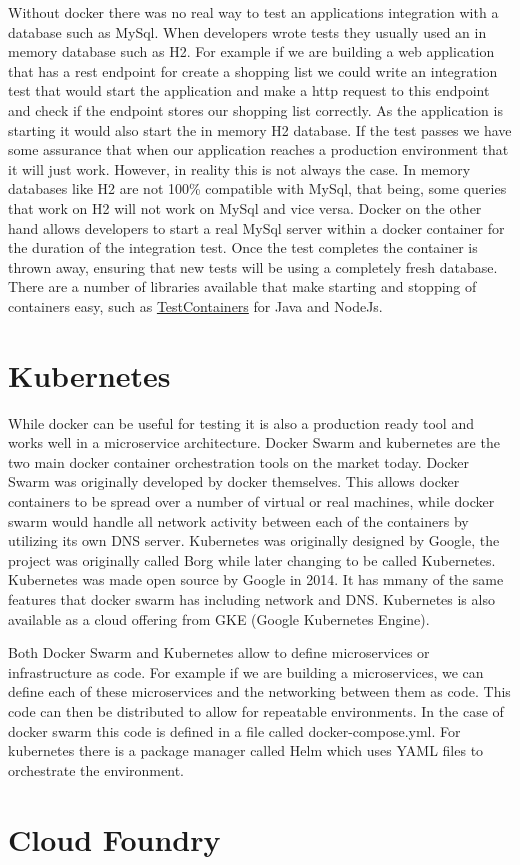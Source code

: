 Without docker there was no real way to test an applications integration with a database such as MySql. When developers wrote tests they usually used an in memory database such as H2. For example if we are building a web application that has a rest endpoint for create a shopping list we could write an integration test that would start the application and make a http request to this endpoint and check if the endpoint stores our shopping list correctly. As the application is starting it would also start the in memory H2 database. If the test passes we have some assurance that when our application reaches a production environment that it will just work. However, in reality this is not always the case. In memory databases like H2 are not 100\% compatible with MySql, that being, some queries that work on H2 will not work on MySql and vice versa. Docker on the other hand allows developers to start a real MySql server within a docker container for the duration of the integration test. Once the test completes the container is thrown away, ensuring that new tests will be using a completely fresh database. There are a number of libraries available that make starting and stopping of containers easy, such as \href{https://www.testcontainers.org/}{TestContainers} for Java and NodeJs.

\section{Kubernetes}

While docker can be useful for testing it is also a production ready tool and works well in a microservice architecture. Docker Swarm and kubernetes are the two main docker container orchestration tools on the market today. Docker Swarm was originally developed by docker themselves. This allows docker containers to be spread over a number of virtual or real machines, while docker swarm would handle all network activity between each of the containers by utilizing its own DNS server. Kubernetes was originally designed by Google, the project was originally called Borg while later changing to be called Kubernetes. Kubernetes was made open source by Google in 2014. It has mmany of the same features that docker swarm has including network and DNS. Kubernetes is also available as a cloud offering from GKE (Google Kubernetes Engine). 

Both Docker Swarm and Kubernetes allow to define microservices or infrastructure as code. For example if we are building a microservices, we can define each of these microservices and the networking between them as code. This code can then be distributed to allow for repeatable environments. In the case of docker swarm this code is defined in a file called docker-compose.yml. For kubernetes there is a package manager called Helm which uses YAML files to orchestrate the environment.

\section{Cloud Foundry}